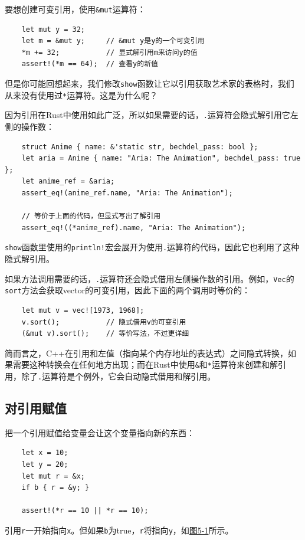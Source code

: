 要想创建可变引用，使用\texttt{\&mut}运算符：
\begin{verbatim}
    let mut y = 32;
    let m = &mut y;     // &mut y是y的一个可变引用
    *m += 32;           // 显式解引用m来访问y的值
    assert!(*m == 64);  // 查看y的新值
\end{verbatim}

但是你可能回想起来，我们修改\texttt{show}函数让它以引用获取艺术家的表格时，我们从来没有使用过\texttt{*}运算符。这是为什么呢？

因为引用在Rust中使用如此广泛，所以如果需要的话，\texttt{.}运算符会隐式解引用它左侧的操作数：
\begin{verbatim}
    struct Anime { name: &'static str, bechdel_pass: bool };
    let aria = Anime { name: "Aria: The Animation", bechdel_pass: true };
    let anime_ref = &aria;
    assert_eq!(anime_ref.name, "Aria: The Animation");

    // 等价于上面的代码，但显式写出了解引用
    assert_eq!((*anime_ref).name, "Aria: The Animation");
\end{verbatim}

\texttt{show}函数里使用的\texttt{println!}宏会展开为使用\texttt{.}运算符的代码，因此它也利用了这种隐式解引用。

如果方法调用需要的话，\texttt{.}运算符还会隐式借用左侧操作数的引用。例如，\texttt{Vec}的\texttt{sort}方法会获取vector的可变引用，因此下面的两个调用时等价的：
\begin{verbatim}
    let mut v = vec![1973, 1968];
    v.sort();           // 隐式借用v的可变引用
    (&mut v).sort();    // 等价写法，不过更详细
\end{verbatim}

简而言之，C++在引用和左值（指向某个内存地址的表达式）之间隐式转换，如果需要这种转换会在任何地方出现；而在Rust中使用\texttt{\&}和\texttt{*}运算符来创建和解引用，除了\texttt{.}运算符是个例外，它会自动隐式借用和解引用。

\subsection{对引用赋值}
把一个引用赋值给变量会让这个变量指向新的东西：
\begin{verbatim}
    let x = 10;
    let y = 20;
    let mut r = &x;
    if b { r = &y; }

    assert!(*r == 10 || *r == 10);
\end{verbatim}

引用\texttt{r}一开始指向\texttt{x}。但如果\texttt{b}为true，\texttt{r}将指向\texttt{y}，如\hyperref[f5-1]{图5-1}所示。


